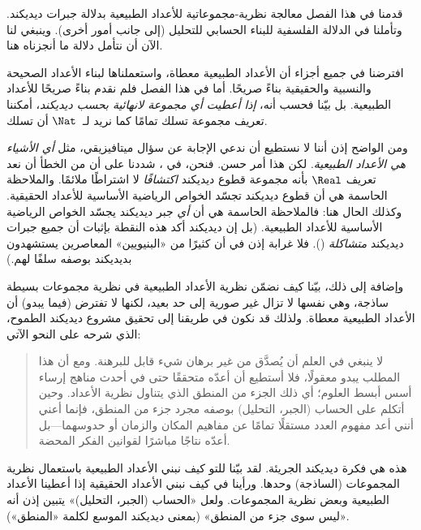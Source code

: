 \documentclass[../../../include/open-logic-section]{subfiles}
\begin{document}


قدمنا في هذا الفصل معالجة نظرية-مجموعاتية للأعداد الطبيعية بدلالة
جبرات ديديكند. وتأملنا في  الدلالة الفلسفية
للبناء الحسابي للتحليل (إلى جانب أمور أخرى). وينبغي لنا الآن أن نتأمل
دلالة ما أنجزناه هنا.

افترضنا في جميع أجزاء  أن الأعداد الطبيعية
معطاة، واستعملناها لبناء الأعداد الصحيحة والنسبية والحقيقية بناءً
صريحًا. أما في هذا الفصل فلم نقدم بناءً صريحًا للأعداد الطبيعية. بل
بيّنا فحسب أنه، \emph{إذا أعطيت أي مجموعة لانهائية بحسب ديديكند}،
أمكننا تعريف مجموعة تسلك تمامًا كما نريد لـ~$\Nat$ أن تسلك.

ومن الواضح إذن أننا لا نستطيع أن ندعي الإجابة عن سؤال ميتافيزيقي، مثل
\emph{أي الأشياء هي الأعداد الطبيعية}. لكن هذا أمر حسن. فنحن، في
، شددنا على أن من الخطأ أن نعد تعريف
$\Real$ بأنه مجموعة قطوع ديديكند \emph{اكتشافًا} لا اشتراطًا ملائمًا.
والملاحظة الحاسمة هي أن قطوع ديديكند تجسّد الخواص الرياضية الأساسية
للأعداد الحقيقية. وكذلك الحال هنا: فالملاحظة الحاسمة هي أن \emph{أي}
جبر ديديكند يجسّد الخواص الرياضية الأساسية للأعداد الطبيعية. (بل إن
ديديكند أكد هذه النقطة بإثبات أن جميع جبرات ديديكند \emph{متشاكلة}
(\citeyear[المبرهنتان
132--3]{Dedekind1888}). فلا غرابة إذن في أن كثيرًا من «البنيويين»
المعاصرين يستشهدون بديديكند بوصفه سلفًا لهم.)

وإضافة إلى ذلك، بيّنا كيف نضمّن نظرية الأعداد الطبيعية في نظرية
مجموعات بسيطة ساذجة، وهي نفسها لا تزال غير صورية إلى حد بعيد، لكنها
لا تفترض (فيما يبدو) أن الأعداد الطبيعية معطاة. ولذلك قد نكون في طريقنا
إلى تحقيق مشروع ديديكند الطموح، الذي شرحه على النحو الآتي:
\begin{quote}
	لا ينبغي في العلم أن يُصدَّق من غير برهان شيء قابل للبرهنة.
	ومع أن هذا المطلب يبدو معقولًا، فلا أستطيع أن أعدّه متحققًا حتى
	في أحدث مناهج إرساء أسس أبسط العلوم؛ أي ذلك الجزء من المنطق الذي
	يتناول نظرية الأعداد. وحين أتكلم على الحساب (الجبر، التحليل)
	بوصفه مجرد جزء من المنطق، فإنما أعني أنني أعد مفهوم العدد مستقلًا
	تمامًا عن مفاهيم المكان والزمان أو حدوسهما---بل أعدّه نتاجًا
	مباشرًا لقوانين الفكر المحضة.
	\citep[المقدمة]{Dedekind1888}
\end{quote}
هذه هي فكرة ديديكند الجريئة. لقد بيّنا للتو كيف نبني الأعداد الطبيعية
باستعمال نظرية المجموعات (الساذجة) وحدها. ورأينا في
 كيف نبني الأعداد الحقيقية إذا أعطينا
الأعداد الطبيعية وبعض نظرية المجموعات. ولعل «الحساب (الجبر، التحليل)»
يتبين إذن أنه «ليس سوى جزء من المنطق» (بمعنى ديديكند الموسع لكلمة
«المنطق»).
\end{document}
